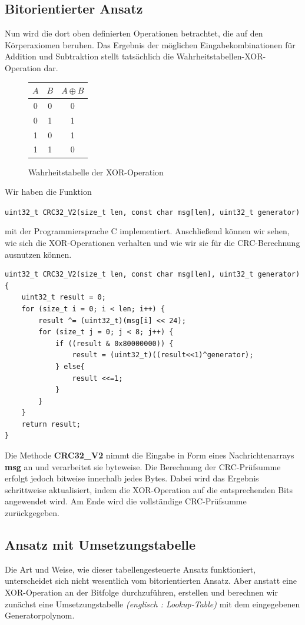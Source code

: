 \documentclass[course=erap]{aspdoc}
\begin{document}
\subsection{Bitorientierter Ansatz}
Nun wird die dort oben definierten Operationen betrachtet, die auf den Körperaxiomen beruhen. Das Ergebnis der möglichen Eingabekombinationen für Addition und Subtraktion stellt tatsächlich die Wahrheitstabellen-XOR-Operation dar.
\begin{figure}[H]
    \centering
    \begin{tabular}{|c|c|c|}
        \hline
        $A$ & $B$ & $A \oplus B$ \\
        \hline
        0 & 0 & 0 \\
        0 & 1 & 1 \\
        1 & 0 & 1 \\
        1 & 1 & 0 \\
        \hline
    \end{tabular}
    \caption{Wahrheitstabelle der XOR-Operation}
\end{figure}
Wir haben die Funktion
\begin{center}
\texttt{uint32\_t CRC32\_V2(size\_t len, const char msg[len], uint32\_t generator)}
\end{center} 
mit der Programmiersprache C implementiert. Anschließend können wir sehen, wie sich die XOR-Operationen verhalten und wie wir sie für die CRC-Berechnung ausnutzen können.
\begin{lstlisting}[style=CStyle]
uint32_t CRC32_V2(size_t len, const char msg[len], uint32_t generator) {
    uint32_t result = 0; 
    for (size_t i = 0; i < len; i++) { 
        result ^= (uint32_t)(msg[i] << 24);
        for (size_t j = 0; j < 8; j++) { 
            if ((result & 0x80000000)) {  
                result = (uint32_t)((result<<1)^generator);
            } else{
                result <<=1;   
            }
        }
    }
    return result; 
}
\end{lstlisting}
    Die Methode \textbf{CRC32\_V2} nimmt die Eingabe in Form eines Nachrichtenarrays \textbf{msg} an und verarbeitet sie byteweise. Die Berechnung der CRC-Prüfsumme erfolgt jedoch bitweise innerhalb jedes Bytes. Dabei wird das Ergebnis schrittweise aktualisiert, indem die XOR-Operation auf die entsprechenden Bits angewendet wird. Am Ende wird die vollständige CRC-Prüfsumme zurückgegeben.
\subsection{Ansatz mit Umsetzungstabelle}
Die Art und Weise, wie dieser tabellengesteuerte Ansatz funktioniert, unterscheidet sich nicht wesentlich vom bitorientierten Ansatz. Aber anstatt eine XOR-Operation an der Bitfolge durchzuführen, erstellen und berechnen wir zunächst eine Umsetzungstabelle \textit{(englisch : Lookup-Table)} mit dem eingegebenen Generatorpolynom. 
\end{document}
